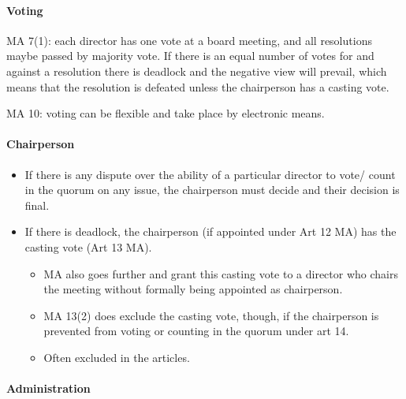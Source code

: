 \documentclass[
]{article}
\providecommand{\tightlist}{%
  \setlength{\itemsep}{0pt}\setlength{\parskip}{0pt}}
\newenvironment{env-12fb5320-b8eb-47b6-8035-097e16242c42}
{
    \savenotes\tcolorbox[blanker,breakable,left=5pt,borderline west={2pt}{-4pt}{green}]
}
{
    \endtcolorbox\spewnotes
}
\begin{document}
\begin{env-12fb5320-b8eb-47b6-8035-097e16242c42}
\end{env-12fb5320-b8eb-47b6-8035-097e16242c42}

\hypertarget{voting}{%
\paragraph{Voting}\label{voting}}

MA 7(1): each director has one vote at a board meeting, and all
resolutions maybe passed by majority vote. If there is an equal number
of votes for and against a resolution there is deadlock and the negative
view will prevail, which means that the resolution is defeated unless
the chairperson has a casting vote.

MA 10: voting can be flexible and take place by electronic means.

\hypertarget{chairperson}{%
\paragraph{Chairperson}\label{chairperson}}

\begin{itemize}
\tightlist
\item
  If there is any dispute over the ability of a particular director to
  vote/ count in the quorum on any issue, the chairperson must decide
  and their decision is final.
\item
  If there is deadlock, the chairperson (if appointed under Art 12 MA)
  has the casting vote (Art 13 MA).

  \begin{itemize}
  \tightlist
  \item
    MA also goes further and grant this casting vote to a director who
    chairs the meeting without formally being appointed as chairperson.
  \item
    MA 13(2) does exclude the casting vote, though, if the chairperson
    is prevented from voting or counting in the quorum under art 14.
  \item
    Often excluded in the articles.
  \end{itemize}
\end{itemize}

\hypertarget{administration}{%
\paragraph{Administration}\label{administration}}
\end{document}
